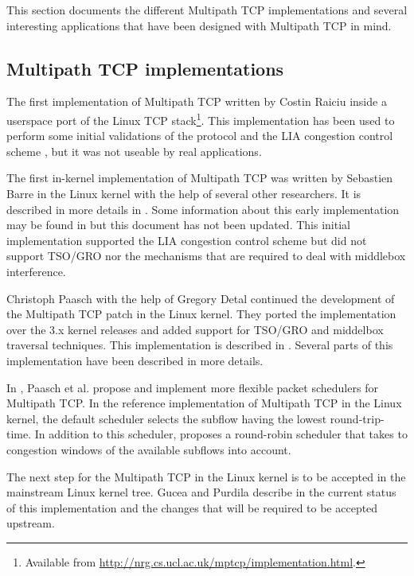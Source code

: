 This section documents the different Multipath TCP implementations \cite{draft-eardley-mptcp-implementations-survey} and several interesting applications that have been designed with Multipath TCP in mind.

\subsection{Multipath TCP implementations}

The first implementation of Multipath TCP written by Costin Raiciu inside a userspace port of the Linux TCP stack\footnote{Available from \url{http://nrg.cs.ucl.ac.uk/mptcp/implementation.html}.}. This implementation has been used to perform some initial validations of the protocol and the LIA congestion control scheme \cite{Wischik_Design:2011}, but it was not useable by real applications.

The first in-kernel implementation of Multipath TCP was written by Sebastien Barre in the Linux kernel with the help of several other researchers. It is described in more details in \cite{Barre_thesis:2011}. Some information about this early implementation may be found in \cite{draft-barre-mptcp-impl} but this document has not been updated. This initial implementation supported the LIA congestion control scheme but did not support TSO/GRO nor the mechanisms that are required to deal with middlebox 
interference.

Christoph Paasch with the help of Gregory Detal continued the development of the Multipath TCP patch in the Linux kernel. They ported the implementation over the 3.x kernel releases and added support for TSO/GRO and middelbox traversal techniques. This implementation is described in \cite{Paasch_Thesis:2014}. Several parts of this implementation have been described in more details.

In \cite{Paasch_schedulers:2014}, Paasch et al. propose and implement more flexible packet schedulers for Multipath TCP. In the reference implementation of Multipath TCP in the Linux kernel, the default scheduler selects the subflow having the lowest round-trip-time. In addition to this scheduler, \cite{Paasch_schedulers:2014} proposes a round-robin scheduler that takes to congestion windows of the available subflows into account.  

The next step for the Multipath TCP in the Linux kernel is to be accepted in the mainstream Linux kernel tree. Gucea and Purdila describe in \cite{Gucea_Shaping:2015} the current status of this implementation and the changes that will be required to be accepted upstream.

